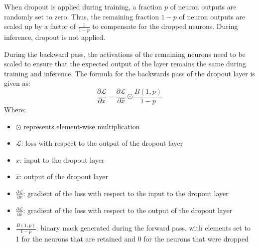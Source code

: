 \documentclass[a4paper]{report}
\newcommand{\ELL}{\mathcal{L}}
\begin{document}
When dropout is applied during training, a fraction $p$ of neuron outputs are randomly set to zero. Thus, the remaining fraction $1-p$ of neuron outputs are scaled up by a factor of $\frac{1}{1-p}$ to compensate for the dropped neurons. During inference, dropout is not applied.

During the backward pass, the activations of the remaining neurons need to be scaled to ensure that the expected output of the layer remains the same during training and inference. The formula for the backwards pass of the dropout layer is given as:
\begin{equation*}
    \frac{\partial\ELL}{\partial x} = \frac{\partial\ELL}{\partial\hat{x}} \odot \frac{B(1,p)}{1-p}
\end{equation*}
Where:
\begin{itemize}
    \item $\odot$ represents element-wise multiplication
    \item $\ELL$: loss with respect to the output of the dropout layer
    \item $x$: input to the dropout layer
    \item $\hat{x}$: output of the dropout layer
    \item $\frac{\partial\ELL}{\partial x}$: gradient of the loss with respect to the input to the dropout layer
    \item $\frac{\partial\ELL}{\partial\hat{x}}$: gradient of the loss with respect to the output of the dropout layer
    \item $\frac{B(1,p)}{1-p}$: binary mask generated during the forward pass, with elements set to 1 for the neurons that are retained and 0 for the neurons that were dropped
\end{itemize}
\end{document}
